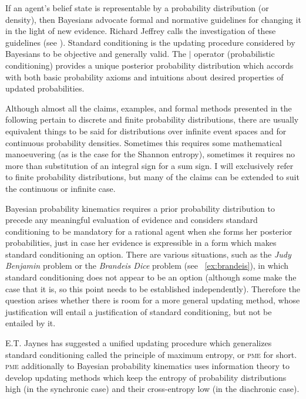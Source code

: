 \documentclass[phd,12pt,oneside]{ubcthesis}
\begin{document}
If an agent's belief state is representable by a probability
distribution (or density), then Bayesians advocate formal and
normative guidelines for changing it in the light of new evidence.
Richard Jeffrey calls the investigation of these guidelines
 (see ). Standard
conditioning is the updating procedure considered by Bayesians to be
objective and generally valid. The $\mid$ operator (probabilistic
conditioning) provides a unique posterior probability distribution
which accords with both basic probability axioms and intuitions about
desired properties of updated probabilities.

Although almost all the claims, examples, and formal methods presented
in the following pertain to discrete and finite probability
distributions, there are usually equivalent things to be said for
distributions over infinite event spaces and for continuous
probability densities. Sometimes this requires some mathematical
manoeuvering (as is the case for the Shannon entropy), sometimes it
requires no more than substitution of an integral sign for a sum sign.
I will exclusively refer to finite probability distributions, but many
of the claims can be extended to suit the continuous or infinite case.

Bayesian probability kinematics requires a prior probability
distribution to precede any meaningful evaluation of evidence and
considers standard conditioning to be mandatory for a rational agent
when she forms her posterior probabilities, just in case her evidence
is expressible in a form which makes standard conditioning an option.
There are various situations, such as the \emph{Judy Benjamin} problem
or the \emph{Brandeis Dice} problem (see {\xample}~\ref{ex:brandeis}),
in which standard conditioning does not appear to be an option
(although some make the case that it is, so this point needs to be
established independently). Therefore the question arises whether
there is room for a more general updating method, whose justification
will entail a justification of standard conditioning, but not be
entailed by it.

E.T. Jaynes has suggested a unified updating procedure which
generalizes standard conditioning called the principle of maximum
entropy, or \textsc{pme} for short. \textsc{pme} additionally to
Bayesian probability kinematics uses information theory to develop
updating methods which keep the entropy of probability distributions
high (in the synchronic case) and their cross-entropy low (in the
diachronic case). 
\end{document}
